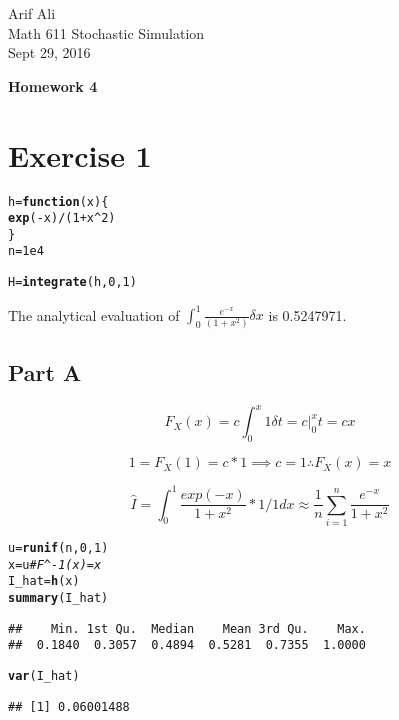 \documentclass{article}\usepackage[]{graphicx}\usepackage[]{color}
\makeatletter
\newcommand{\hlnum}[1]{\textcolor[rgb]{0.686,0.059,0.569}{#1}}%
\newcommand{\hlcom}[1]{\textcolor[rgb]{0.678,0.584,0.686}{\textit{#1}}}%
\newcommand{\hlopt}[1]{\textcolor[rgb]{0,0,0}{#1}}%
\newcommand{\hlstd}[1]{\textcolor[rgb]{0.345,0.345,0.345}{#1}}%
\newcommand{\hlkwa}[1]{\textcolor[rgb]{0.161,0.373,0.58}{\textbf{#1}}}%
\newcommand{\hlkwb}[1]{\textcolor[rgb]{0.69,0.353,0.396}{#1}}%
\newcommand{\hlkwc}[1]{\textcolor[rgb]{0.333,0.667,0.333}{#1}}%
\newcommand{\hlkwd}[1]{\textcolor[rgb]{0.737,0.353,0.396}{\textbf{#1}}}%
\newenvironment{kframe}{%
 \def\at@end@of@kframe{}%
 \ifinner\ifhmode%
  \def\at@end@of@kframe{\end{minipage}}%
  \begin{minipage}{\columnwidth}%
 \fi\fi%
 \def\FrameCommand##1{\hskip\@totalleftmargin \hskip-\fboxsep
 \colorbox{shadecolor}{##1}\hskip-\fboxsep
     \hskip-\linewidth \hskip-\@totalleftmargin \hskip\columnwidth}%
 \MakeFramed {\advance\hsize-\width
   \@totalleftmargin\z@ \linewidth\hsize
   \@setminipage}}%
 {\par\unskip\endMakeFramed%
 \at@end@of@kframe}
\newenvironment{knitrout}{}{} %
\makeatother
\begin{document}
\begin{flushright}
Arif Ali\\
Math 611 Stochastic Simulation\\
Sept 29, 2016\\
\end{flushright}

\begin{center}
\LARGE\textbf{Homework 4}
  \end{center}
\section*{Exercise 1}
\begin{knitrout}
\color{fgcolor}\begin{kframe}
\begin{alltt}
\hlstd{h} \hlkwb{=} \hlkwa{function}\hlstd{(}\hlkwc{x}\hlstd{)\{}
  \hlkwd{exp}\hlstd{(}\hlopt{-}\hlstd{x)}\hlopt{/}\hlstd{(}\hlnum{1}\hlopt{+}\hlstd{x}\hlopt{^}\hlnum{2}\hlstd{)}
\hlstd{\}}
\hlstd{n} \hlkwb{=} \hlnum{1e4}

\hlstd{H} \hlkwb{=} \hlkwd{integrate}\hlstd{(h,} \hlnum{0}\hlstd{,} \hlnum{1}\hlstd{)}
\end{alltt}
\end{kframe}
\end{knitrout}
The analytical evaluation of $\int_{0}^{1} \frac{e^{-x}}{(1+x^2)} \delta x$ is 0.5247971.
\subsection*{Part A}
\begin{equation}
  F_X(x) = c \int_{0}^{x} 1 \delta t = c \big|_0^x t = cx 
\end{equation}

\begin{equation}
  1 = F_X(1) = c*1 \implies c = 1 \therefore F_X(x) = x
\end{equation}

\begin{equation}
  \hat{I} = \int_{0}^{1} \frac{exp(-x)}{1+x^2}*1/1 dx \approx \frac{1}{n}\sum_{i=1}^{n} \frac{e^{-x}}{1+x^2}
\end{equation}
\begin{knitrout}
\color{fgcolor}\begin{kframe}
\begin{alltt}
\hlstd{u} \hlkwb{=} \hlkwd{runif}\hlstd{(n,}\hlnum{0}\hlstd{,}\hlnum{1}\hlstd{)}
\hlstd{x} \hlkwb{=} \hlstd{u} \hlcom{# F^-1(x) = x}
\hlstd{I_hat} \hlkwb{=} \hlkwd{h}\hlstd{(x)}
\hlkwd{summary}\hlstd{(I_hat)}
\end{alltt}
\begin{verbatim}
##    Min. 1st Qu.  Median    Mean 3rd Qu.    Max. 
##  0.1840  0.3057  0.4894  0.5281  0.7355  1.0000
\end{verbatim}
\begin{alltt}
\hlkwd{var}\hlstd{(I_hat)}
\end{alltt}
\begin{verbatim}
## [1] 0.06001488
\end{verbatim}
\end{kframe}
\end{knitrout}
\end{document}
